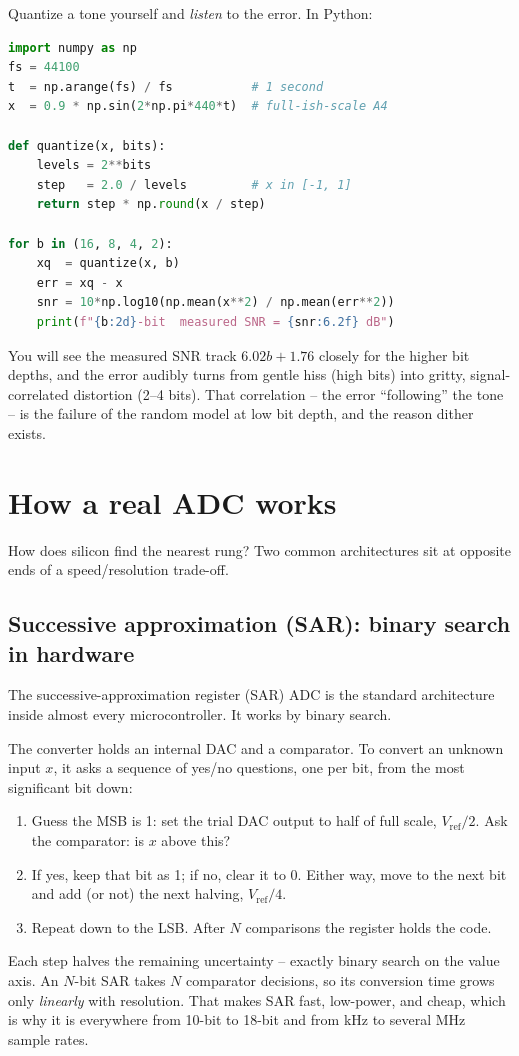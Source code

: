 \begin{labbox}
Quantize a tone yourself and \emph{listen} to the error. In Python:
\begin{lstlisting}[language=Python]
import numpy as np
fs = 44100
t  = np.arange(fs) / fs           # 1 second
x  = 0.9 * np.sin(2*np.pi*440*t)  # full-ish-scale A4

def quantize(x, bits):
    levels = 2**bits
    step   = 2.0 / levels         # x in [-1, 1]
    return step * np.round(x / step)

for b in (16, 8, 4, 2):
    xq  = quantize(x, b)
    err = xq - x
    snr = 10*np.log10(np.mean(x**2) / np.mean(err**2))
    print(f"{b:2d}-bit  measured SNR = {snr:6.2f} dB")
\end{lstlisting}
You will see the measured SNR track $6.02b+1.76$ closely for the higher bit depths, and the error
audibly turns from gentle hiss (high bits) into gritty, signal-correlated distortion (2--4 bits).
That correlation -- the error ``following'' the tone -- is the failure of the random model at low
bit depth, and the reason dither exists.
\end{labbox}

\section{How a real ADC works}
\label{ch19:adc-arch}

How does silicon find the nearest rung? Two common architectures sit at opposite ends of a speed/resolution trade-off.

\subsection{Successive approximation (SAR): binary search in hardware}
\label{ch19:sar}
The successive-approximation register (SAR) ADC is the standard architecture inside almost every
microcontroller. It works by binary search.

The converter holds an internal DAC and a comparator. To convert an unknown input $x$, it asks a
sequence of yes/no questions, one per bit, from the most significant bit down:
\begin{enumerate}
  \item Guess the MSB is 1: set the trial DAC output to half of full scale,
        $V_{\mathrm{ref}}/2$. Ask the comparator: is $x$ above this?
  \item If yes, keep that bit as 1; if no, clear it to 0. Either way, move to the next bit and
        add (or not) the next halving, $V_{\mathrm{ref}}/4$.
  \item Repeat down to the LSB. After $N$ comparisons the register holds the code.
\end{enumerate}
Each step halves the remaining uncertainty -- exactly binary search on the value axis. An $N$-bit
SAR takes $N$ comparator decisions, so its conversion time grows only \emph{linearly} with
resolution. That makes SAR fast, low-power, and cheap, which is why it is everywhere from 10-bit
to 18-bit and from kHz to several MHz sample rates.

